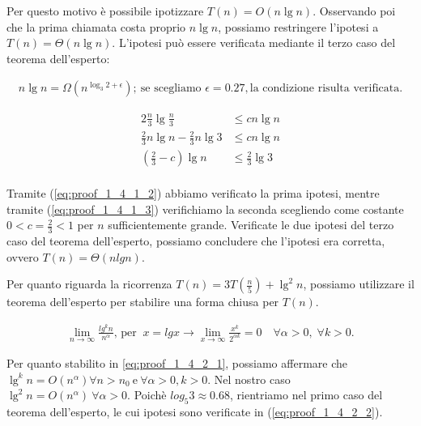 \documentclass{article}
\begin{document}
\noindent Per questo motivo è possibile ipotizzare $T(n) = O(n\lg{n})$. Osservando poi che la prima chiamata costa proprio $n \lg{n}$, possiamo restringere l'ipotesi a $T(n) = \Theta(n \lg{n})$. L'ipotesi può essere verificata mediante il terzo caso del teorema dell'esperto:

\begin{equation} \label{eq:proof_1_4_1_2}
\begin{aligned}
n \lg{n} = \Omega(n^{\log_{3}{2} + \epsilon}); \ \text{se scegliamo } \epsilon = 0.27, \text{la condizione risulta verificata}.
\end{aligned}
\end{equation}

\begin{equation} \label{eq:proof_1_4_1_3}
\begin{aligned}
2 \frac{n}{3} \lg{\frac{n}{3}} &\le c n \lg{n} \\
\frac{2}{3} n \lg{n} - \frac{2}{3} n \lg{3} &\le c n \lg{n} \\
\left(\frac{2}{3} - c\right) \lg{n} &\le \frac{2}{3} \lg{3} \\
\end{aligned}
\end{equation}

\noindent  Tramite (\ref{eq:proof_1_4_1_2}) abbiamo verificato la prima ipotesi, mentre tramite (\ref{eq:proof_1_4_1_3}) verifichiamo la seconda scegliendo come costante $ 0 < c=\frac{2}{3} < 1$ per $n$ sufficientemente grande. Verificate le due ipotesi del terzo caso del teorema dell'esperto, possiamo concludere che l'ipotesi era corretta, ovvero $T(n) = \Theta(n lg{n})$.

\vspace{\baselineskip}

\noindent Per quanto riguarda la ricorrenza $T(n) = 3T(\frac{n}{5}) + \lg^2 n$, possiamo utilizzare il teorema dell'esperto per stabilire una forma chiusa per $T(n)$.


\begin{equation} \label{eq:proof_1_4_2_1}
\begin{aligned}
\lim_{n\to\infty} \frac{lg^k n}{n^\alpha} \text{, per } \ x = lg{x} \rightarrow \lim_{x\to\infty} \frac{x^k}{2^{\alpha k}} = 0 \quad \forall \alpha>0, \; \forall k>0.
\end{aligned}
\end{equation}

\noindent Per quanto stabilito in \ref{eq:proof_1_4_2_1}, possiamo affermare che $\lg^k n = O(n^\alpha)  \forall n>n_0 \ \text{e} \ \forall \alpha > 0, k>0$. Nel nostro caso $\lg^2 n = O(n^\alpha) \  \forall \alpha > 0$. Poichè $log_{5}{3} \approx 0.68 $, rientriamo nel primo caso del teorema dell'esperto, le cui ipotesi sono verificate in (\ref{eq:proof_1_4_2_2}).
\end{document}
